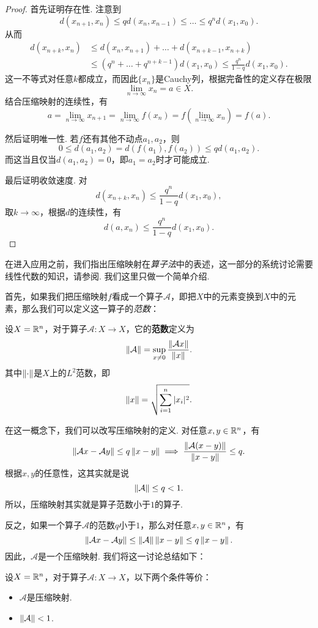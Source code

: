 \begin{proof}
首先证明存在性. 注意到
\[d(x_{n+1},x_n)\leq qd(x_n,x_{n-1})\leq \dots\leq q^nd(x_1,x_0).\]
从而
\begin{align*}
d(x_{n+k},x_n)&\leq d(x_n,x_{n+1})+\dots+d(x_{n+k-1},x_{n+k})\\
&\leq(q^n+\dots+q^{n+k-1})d(x_1,x_0)\leq \frac{q^{n}}{1-q}d(x_1,x_0).
\end{align*}
这一不等式对任意$k$都成立，而因此$\{x_n\}$是Cauchy列，根据完备性的定义存在极限
\[\lim_{n\to\infty} x_n=a\in X.\]
结合压缩映射的连续性，有
\[a=\lim_{n\to\infty}x_{n+1} = \lim_{n\to\infty}f(x_n)=f\left(\lim_{n\to\infty}x_n\right)=f(a).\]

然后证明唯一性. 若$f$还有其他不动点$a_1,a_2$，则
\[0\leq d(a_1,a_2)=d(f(a_1),f(a_2))\leq qd(a_1,a_2).\]
而这当且仅当$d(a_1,a_2)=0$，即$a_1=a_2$时才可能成立.

最后证明收敛速度. 对
\[d(x_{n+k},x_n)\leq \frac{q^n}{1-q}d(x_1,x_0),\]
取$k\to\infty$，根据$d$的连续性，有
\[d(a,x_n)\leq \frac{q^n}{1-q}d(x_1,x_0).\]
\end{proof}

在进入应用之前，我们指出压缩映射在\textit{算子法}中的表述，这一部分的系统讨论需要线性代数的知识，请参阅. 我们这里只做一个简单介绍. 

首先，如果我们把压缩映射$f$看成一个算子$\mathcal A$，即把$X$中的元素变换到$X$中的元素，那么我们可以定义这一算子的\textit{范数}：

\begin{definition}[算子范数]
    设$X=\mathbb{R}^n$，对于算子$\mathcal A:X\to X$，它的\textbf{范数}定义为
    \[\left\|\mathcal A\right\|=\sup_{x\neq 0}\frac{\left\|\mathcal A x\right\|}{\left\|x\right\|}.\]
    其中$\left\|\cdot\right\|$是$X$上的$L^2$范数，即
    \[\left\|x\right\|=\sqrt{\sum_{i=1}^n|x_i|^2}.\]
\end{definition}

在这一概念下，我们可以改写压缩映射的定义. 对任意$x,y\in \mathbb{R}^n$，有
\[\left\|\mathcal A x-\mathcal A y\right\|\leq q\left\|x-y\right\|\implies \frac{\left\|\mathcal A(x-y)\right\|}{\left\|x-y\right\|}\leq q.\]
根据$x,y$的任意性，这其实就是说
\[\left\|\mathcal A\right\|\leq q<1.\]
所以，压缩映射其实就是算子范数小于$1$的算子. 

反之，如果一个算子$\mathcal A$的范数$q$小于$1$，那么对任意$x,y\in \mathbb{R}^n$，有
\[\left\|\mathcal A x-\mathcal A y\right\|\leq \left\|\mathcal A\right\|\left\|x-y\right\|\leq q\left\|x-y\right\|.\]
因此，$\mathcal A$是一个压缩映射. 我们将这一讨论总结如下：

\begin{theorem}\label{thm:operator-fixed-point}
    设$X=\mathbb{R}^n$，对于算子$\mathcal A:X\to X$，以下两个条件等价：
    \begin{itemize}
        \item $\mathcal A$是压缩映射.
        \item $\left\|\mathcal A\right\|<1$.
    \end{itemize}
\end{theorem}

